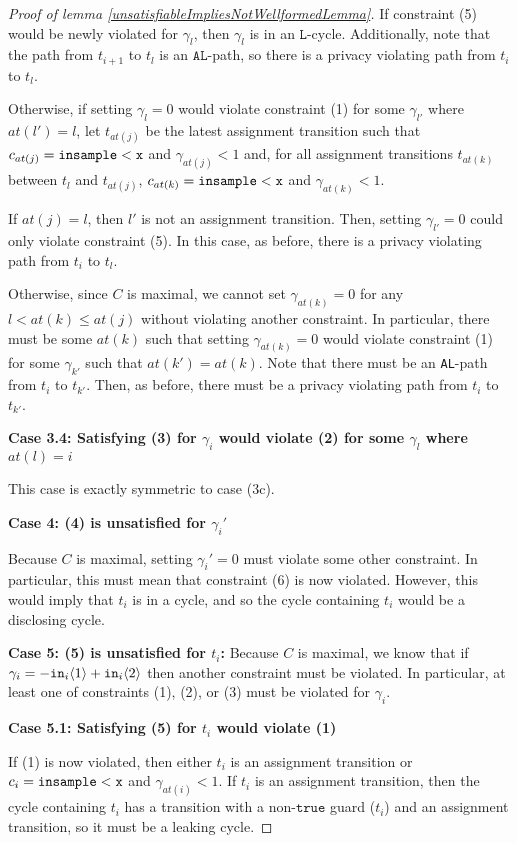 \begin{proof}[Proof of lemma \ref{unsatisfiableImpliesNotWellformedLemma}]
    If constraint (5) would be newly violated for $\gamma_l$, then $\gamma_l$ is in an $\texttt{L}$-cycle. Additionally, note that the path from $t_{i+1}$ to $t_l$ is an $\texttt{AL}$-path, so there is a privacy violating path from $t_i$ to $t_l$. 

    Otherwise, if setting $\gamma_l = 0$ would violate constraint (1) for some $\gamma_{l'}$ where $at(l')=l$, let $t_{at(j)}$ be the latest assignment transition such that $c_{at(j)} = \lguard[\texttt{x}]$ and $\gamma_{at(j)}<1$ and, for all assignment transitions $t_{at(k)}$ between $t_l$ and $t_{at(j)}$, $c_{at(k)} = \lguard[\texttt{x}]$ and $\gamma_{at(k)}<1$. 

    If $at(j) = l$, then $l'$ is not an assignment transition. Then, setting $\gamma_{l'} = 0$ could only violate constraint (5). In this case, as before, there is a privacy violating path from $t_i$ to $t_l$. 

    Otherwise, since $C$ is maximal, we cannot set $\gamma_{at(k)}=0$ for any $l<at(k)\leq at(j)$ without violating another constraint. In particular, there must be some $at(k)$ such that setting $\gamma_{at(k)} = 0$ would violate constraint (1) for some $\gamma_{k'}$ such that $at(k') = at(k)$. Note that there must be an \texttt{AL}-path from $t_i$ to $t_{k'}$. Then, as before, there must be a privacy violating path from $t_i$ to $t_{k'}$. 


    \textbf{Case 3.4: Satisfying (3) for $\gamma_i$ would violate (2) for some $\gamma_l$ where $at(l) = i$} 

    This case is exactly symmetric to case (3c).

    \textbf{Case 4: (4) is unsatisfied for $\gamma_i'$}
    
    Because $C$ is maximal, setting $\gamma_i'=0$ must violate some other constraint. In particular, this must mean that constraint (6) is now violated. However, this would imply that $t_i$ is in a cycle, and so the cycle containing $t_i$ would be a disclosing cycle.

    \textbf{Case 5: (5) is unsatisfied for $t_i$:} Because $C$ is maximal, we know that if $\gamma_i = -\texttt{in}_i\brangle{1}+\texttt{in}_i\brangle{2}$ then another constraint must be violated. In particular, at least one of constraints (1), (2), or (3) must be violated for $\gamma_i$. 
    
    \textbf{Case 5.1: Satisfying (5) for $t_i$ would violate (1)}

    If (1) is now violated, then either $t_i$ is an assignment transition or $c_i = \lguard[\texttt{x}]$ and $\gamma_{at(i)}<1$. If $t_i$ is an assignment transition, then the cycle containing $t_i$ has a transition with a non-$\texttt{true}$ guard ($t_i$) and an assignment transition, so it must be a leaking cycle. 


\end{proof}
